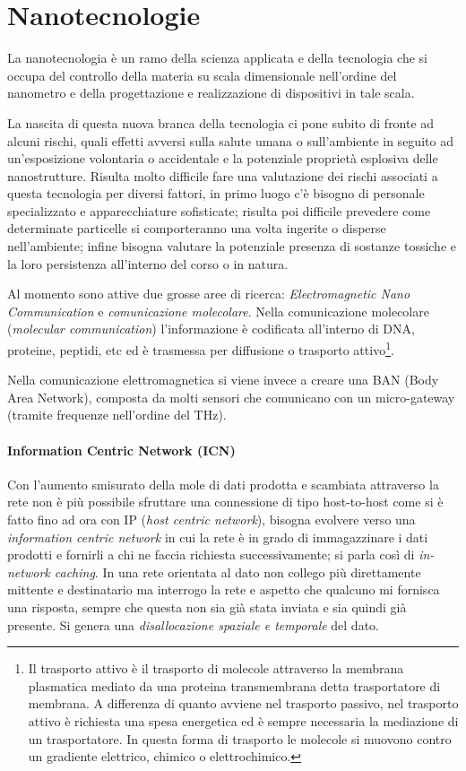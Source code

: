 \section{Nanotecnologie}

	La nanotecnologia è un ramo della scienza applicata e della tecnologia che si occupa del controllo della materia su scala dimensionale nell'ordine del nanometro e della progettazione e realizzazione di dispositivi in tale scala.
	
	La nascita di questa nuova branca della tecnologia ci pone subito di fronte ad alcuni rischi, quali effetti avversi sulla salute umana o sull'ambiente in seguito ad un'esposizione volontaria o accidentale e la potenziale proprietà esplosiva delle nanostrutture.
	Risulta molto difficile fare una valutazione dei rischi associati a questa tecnologia per diversi fattori,
	in primo luogo c'è bisogno di personale specializzato e apparecchiature sofisticate;
	risulta poi difficile prevedere come determinate particelle si comporteranno una volta ingerite o disperse nell'ambiente; infine bisogna valutare la potenziale presenza di sostanze tossiche e la loro persistenza all'interno del corso o in natura.
	
	Al momento sono attive due grosse aree di ricerca: \emph{Electromagnetic Nano Communication} e \emph{comunicazione molecolare}.
	Nella comunicazione molecolare (\emph{molecular communication}) l'informazione è codificata all'interno di DNA, proteine, peptidi, etc ed è trasmessa per diffusione o trasporto attivo\footnote{Il trasporto attivo è il trasporto di molecole attraverso la membrana plasmatica mediato da una proteina transmembrana detta trasportatore di membrana.
		A differenza di quanto avviene nel trasporto passivo, nel trasporto attivo è richiesta una spesa energetica ed è sempre necessaria la mediazione di un trasportatore.
		In questa forma di trasporto le molecole si muovono contro un gradiente elettrico, chimico o elettrochimico.}.
	
	Nella comunicazione elettromagnetica si viene invece a creare una BAN (Body Area Network), composta da molti sensori che comunicano con un micro-gateway (tramite frequenze nell'ordine del THz).
	
	\paragraph{Information Centric Network (ICN)}
	Con l'aumento smisurato della mole di dati prodotta e scambiata attraverso la rete non è più possibile sfruttare una connessione di tipo host-to-host come si è fatto fino ad ora con IP (\emph{host centric network}), bisogna evolvere verso una \emph{information centric network} in cui la rete è in grado di immagazzinare i dati prodotti e fornirli a chi ne faccia richiesta successivamente; si parla così di \emph{in-network caching}.
	In una rete orientata al dato non collego più direttamente mittente e destinatario ma interrogo la rete e aspetto che qualcuno mi fornisca una risposta, sempre che questa non sia già stata inviata e sia quindi già presente.
	Si genera una \emph{disallocazione spaziale e temporale} del dato.
	

